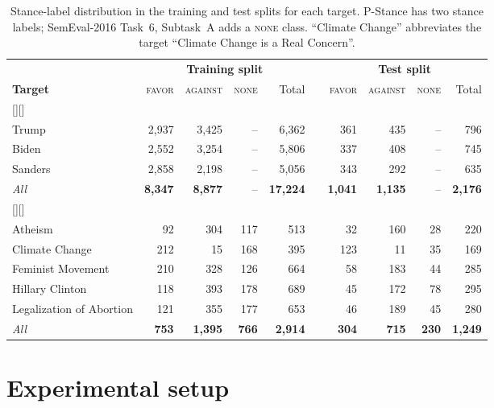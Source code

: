 \documentclass[pdflatex,sn-mathphys-num,iicol]{sn-jnl}%
\makeatletter
\newlength{\bandoverhang}\setlength{\bandoverhang}{0pt}
\newcommand{\bandstrut}{\rule[-0.8ex]{0pt}{3.2ex}}
\newcommand{\tabband}[2]{%
  \rowcolor{snband}[\bandoverhang][\bandoverhang]\multicolumn{#1}{@{}l@{}}{\bandstrut#2}\\}
\makeatother
\begin{document}
\begin{table}[t]
	\caption{Stance-label distribution in the training and test splits for each target. P-Stance \cite{li2021p} has two stance labels; SemEval-2016 Task~6, Subtask~A \cite{mohammad2016semeval} adds a \textsc{none} class. ``Climate Change'' abbreviates the target ``Climate Change is a Real Concern''.}
	\label{tab:datasets}
	\centering
	\tablebodyfont
	\setlength{\tabcolsep}{0pt}
	\renewcommand{\arraystretch}{1.12}
	\begin{tabular*}{\textwidth}{@{\extracolsep{\fill}}lrrrrcrrrr@{}}
		\toprule
		& \multicolumn{4}{c}{\textbf{Training split}} && \multicolumn{4}{c}{\textbf{Test split}} \\
		\cmidrule{2-5}\cmidrule{7-10}
		\textbf{Target} & \textsc{favor} & \textsc{against} & \textsc{none} & Total && \textsc{favor} & \textsc{against} & \textsc{none} & Total \\
		\midrule
		\tabband{10}{\textsc{P-Stance}}
		Trump & 2,937 & 3,425 & -- & 6,362 && 361 & 435 & -- & 796 \\
		Biden & 2,552 & 3,254 & -- & 5,806 && 337 & 408 & -- & 745 \\
		Sanders & 2,858 & 2,198 & -- & 5,056 && 343 & 292 & -- & 635 \\
		\textit{All} & \textbf{8,347} & \textbf{8,877} & -- & \textbf{17,224} && \textbf{1,041} & \textbf{1,135} & -- & \textbf{2,176} \\
		\addlinespace[4pt]
		\tabband{10}{\textsc{SemEval-2016 Task~6, Subtask~A}}
		Atheism & 92 & 304 & 117 & 513 && 32 & 160 & 28 & 220 \\
		Climate Change & 212 & 15 & 168 & 395 && 123 & 11 & 35 & 169 \\
		Feminist Movement & 210 & 328 & 126 & 664 && 58 & 183 & 44 & 285 \\
		Hillary Clinton & 118 & 393 & 178 & 689 && 45 & 172 & 78 & 295 \\
		Legalization of Abortion & 121 & 355 & 177 & 653 && 46 & 189 & 45 & 280 \\
		\textit{All} & \textbf{753} & \textbf{1,395} & \textbf{766} & \textbf{2,914} && \textbf{304} & \textbf{715} & \textbf{230} & \textbf{1,249} \\
		\bottomrule
	\end{tabular*}
\end{table}

\section{Experimental setup}\label{sec5}
\end{document}
